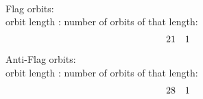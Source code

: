 \\
Flag orbits:\\
orbit length : number of orbits of that length:\\
$$
\begin{array}{*{2}c}
21  & 1\\
\end{array}
$$
Anti-Flag orbits:\\
orbit length : number of orbits of that length:\\
$$
\begin{array}{*{2}c}
28  & 1\\
\end{array}
$$
